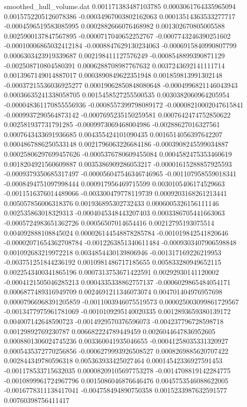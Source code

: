 \begin{filecontents}{smoothed_hull_volume.dat}
0.001171383487103785	0.0003061764335965094	0.0015752205126078386	-0.00034967003802162063	0.00013514363533277717	-0.0004596519583085995	0.0002882666076468982	0.001302670805005588	0.0025900137847567895	-0.0000717040652252767	-0.0007743246390251602	-0.00010006865032412184	-0.0008847629130234063	-0.0006915840990807799	0.0006303423919339687	0.002198411127576249	-0.0008548899390871129	-0.002508710804580391	0.0006288708987767632	0.0037243692141111714
0.0013967149014887017	0.0003890849622351948	0.001859813991302148	-0.00037215536036925277	0.00019062850848080648	-0.0004996821146043943	0.00036635241338058705	0.0015458527255500535	0.0030382060964205954	-0.000048361170855556936	-0.0008557399798089172	-0.00008210002047615841	-0.0009937290564873142	-0.0007695235150259581	0.0007642474752850622	0.002581937731791285	-0.0009973069468004986	-0.00288627016327561	0.0007643433691936685	0.004355424101090435
0.0016514056397642207	0.0004867886250533148	0.0021796063226684186	-0.0003908245599034887	0.00025806297699457626	-0.0005376780609455084	0.0004582475353460619	0.0018204921560609887	0.0035386909286053217	-0.00001615288857925593	-0.0009379350685317497	-0.000056047546346746965	-0.001107958559018341	-0.0008494751097998444	0.000917956469715599	0.0030105406174529663	-0.0011516376014489066	-0.003300479778119739	0.0009203168261213441	0.005057856006318376
0.001936895302732433	0.0006005326156111146	0.002535863018329313	-0.0004045348443207403	0.0003386705441663063	-0.0005724983651362726	0.00056507014654416	0.00212795193075514	0.004092888108845024	0.000026144548878285784	-0.001019842541820646	-0.00002071654362708784	-0.0012263851340611484	-0.0009303407906598848	0.001092683219972218	0.0034854430139806946	-0.001317169226219953	-0.003751251844236192	0.0010981486717185655	0.005833280949652115
0.0022543400341865196	0.0007313753671422591	0.00292930141120002	-0.0004121505046285213	0.0004335338862757137	-0.0006029865484054171	0.0006877489316949709	0.0024691211346073074	0.004701404976957698	0.00007966968391205859	-0.0011003946075519573	0.000025003099861729567	-0.0013477975961781069	-0.0010109295140020335	0.0012893659380139172	0.004007142648590723	-0.0014929570376596073	-0.004237796728598718	0.00129892769230787	0.006682224789449459
0.0026044647836952605	0.0008801306024745236	0.003360041935046655	-0.00041258035331320927	0.0005435372770256856	-0.0006279993926508527	0.0008269885620707422	0.002844349780596318	0.005363933425027464	0.00014542336927591453	-0.001178533715632035	0.00008209105697753278	-0.0014708819142284775	-0.0010899961724967796	0.0015086046876646476	0.0045753546088622005	-0.0016778311138417041	-0.004758494890750358	0.0015233987632591577	0.00760398756411417

\end{filecontents}
